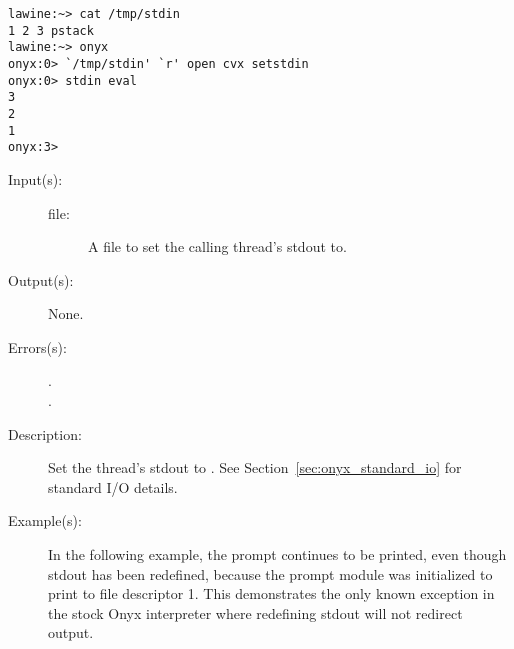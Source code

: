 \begin{description}
\begin{description}
\begin{verbatim}
lawine:~> cat /tmp/stdin
1 2 3 pstack
lawine:~> onyx
onyx:0> `/tmp/stdin' `r' open cvx setstdin
onyx:0> stdin eval
3
2
1
onyx:3>
		\end{verbatim}
	\end{description}
\label{systemdict:setstdout}
\item[{\onyxop{file}{setstdout}{--}}: ]
	\begin{description}\item[]
	\item[Input(s): ]
		\begin{description}\item[]
		\item[file: ]
			A file to set the calling thread's stdout to.
		\end{description}
	\item[Output(s): ] None.
	\item[Errors(s): ]
		\begin{description}\item[]
		\item[.]
		\item[.]
		\end{description}
	\item[Description: ]
		Set the thread's stdout to .  See
		Section~\ref{sec:onyx_standard_io} for standard I/O details.
	\item[Example(s): ]
		In the following example, the prompt continues to be printed,
		even though stdout has been redefined, because the prompt module
		was initialized to print to file descriptor 1.  This
		demonstrates the only known exception in the stock Onyx
		interpreter where redefining stdout will not redirect output.
\begin{verbatim}


\end{verbatim}
\end{description}
\end{description}
